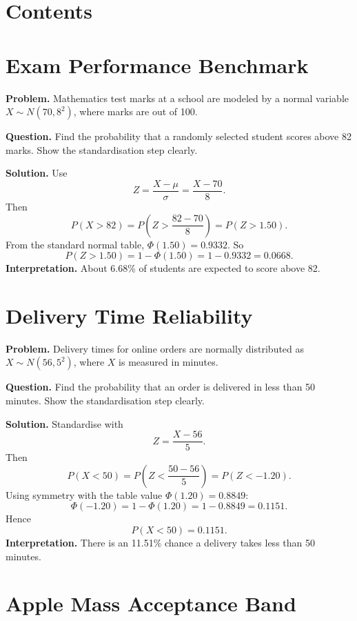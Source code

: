 




\section*{Contents}
\tableofcontents
\section{Exam Performance Benchmark}

\textbf{Problem.}
Mathematics test marks at a school are modeled by a normal variable
\(X\sim N(70,8^2)\), where marks are out of 100.

\textbf{Question.}
Find the probability that a randomly selected student scores above 82 marks.
Show the standardisation step clearly.

\textbf{Solution.}
Use
\[
Z=\frac{X-\mu}{\sigma}=\frac{X-70}{8}.
\]
Then
\[
P(X>82)=P\!\left(Z>\frac{82-70}{8}\right)=P(Z>1.50).
\]
From the standard normal table, \(\Phi(1.50)=0.9332\).
So
\[
P(Z>1.50)=1-\Phi(1.50)=1-0.9332=0.0668.
\]
\textbf{Interpretation.}
About 6.68\% of students are expected to score above 82.

\section{Delivery Time Reliability}

\textbf{Problem.}
Delivery times for online orders are normally distributed as
\(X\sim N(56,5^2)\), where \(X\) is measured in minutes.

\textbf{Question.}
Find the probability that an order is delivered in less than 50 minutes.
Show the standardisation step clearly.

\textbf{Solution.}
Standardise with
\[
Z=\frac{X-56}{5}.
\]
Then
\[
P(X<50)=P\!\left(Z<\frac{50-56}{5}\right)=P(Z<-1.20).
\]
Using symmetry with the table value \(\Phi(1.20)=0.8849\):
\[
\Phi(-1.20)=1-\Phi(1.20)=1-0.8849=0.1151.
\]
Hence
\[
P(X<50)=0.1151.
\]
\textbf{Interpretation.}
There is an 11.51\% chance a delivery takes less than 50 minutes.

\section{Apple Mass Acceptance Band}


